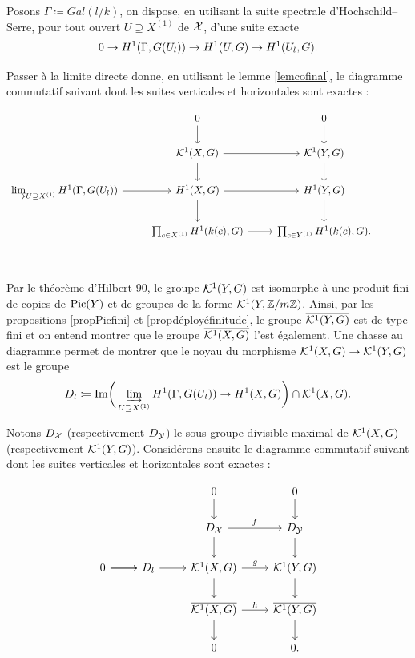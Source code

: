 \documentclass[11pt]{article}
\begin{document}
Posons $\Gamma \coloneqq Gal(l/k)$, on dispose, en utilisant la suite spectrale d'Hochschild–Serre, pour tout ouvert $U \supseteq X^{(1)}$ de $\mathcal{X}$, d'une suite exacte
$$
0 \rightarrow H^1(\Gamma, G(U_{l})) \rightarrow H^1(U, G) \rightarrow H^1(U_{l}, G).
$$

Passer à la limite directe donne, en utilisant le lemme \ref{lemcofinal}, le diagramme commutatif suivant dont les suites verticales et horizontales sont exactes :

\[\begin{tikzcd}
    & 0 & 0 \\
	& \CK^1(X, G) & \CK^1(Y, G) \\
	{ \drl_{U \supseteq X^{(1)}} H^1(\Gamma, G(U_l))} & {H^1(X, G)} & {H^1(Y, G)} & {} \\
	 & {\prod_{c \in X^{(1)}} H^1(k(c), G)} & {\prod_{c \in Y^{(1)}} H^1(k(c), G).}  \\
	\arrow[from=2-2, to=2-3]
    \arrow[from=3-1, to=3-2]
    \arrow[from=3-2, to=3-3]
    \arrow[from=4-2, to=4-3]
	\arrow[from=2-2, to=3-2]
	\arrow[from=2-3, to=3-3]
    \arrow[from=1-2, to=2-2]
	\arrow[from=1-3, to=2-3]
    \arrow[from=3-2, to=4-2]
    \arrow[from=3-3, to=4-3]
\end{tikzcd}\]

Par le théorème d'Hilbert 90, le groupe $\mathcal{K}^1(Y, G)$ est isomorphe à une produit fini de copies de $\operatorname{Pic}(Y)$ et de groupes de la forme $\mathcal{K}^1(Y, \mathbb{Z} /m\mathbb{Z})$. Ainsi, par les propositions \ref{propPicfini} et \ref{propdéployéfinitude}, le groupe $\overline{\mathcal{K}^1(Y,G)}$ est de type fini et on entend montrer que le groupe $\overline{\mathcal{K}^1(X,G)}$ l'est également.
 Une chasse au diagramme permet de montrer que le noyau du morphisme $\mathcal{K}^1(X,G) \rightarrow \mathcal{K}^1(Y,G)$ est le groupe 
 $$
 D_{l} \coloneqq \text{Im}\bigg(\drl_{U \supseteq X^{(1)}} H^1(\Gamma, G(U_l)) \ra H^1(X, G) \bigg) \cap \CK^1(X, G).$$
 
Notons $D_{\mathcal{X}}$ (respectivement $D_{\mathcal{Y}}$) le sous groupe divisible maximal de $\mathcal{K}^1(X,G)$ (respectivement $\mathcal{K}^1(Y,G)$).
Considérons  ensuite le diagramme commutatif suivant dont les suites verticales et horizontales sont exactes :

\[\begin{tikzcd}
   &  & 0 & 0 \\
  & &   D_{\CX} & D_{\CY} \\
	0 & D_{l} & \CK^1(X, G) & \CK^1(Y, G) \\
 & & {\ol{\CK^1(X, G)}} & {\ol{\CK^1(Y, G)}} \\
 &  & 0 & 0. \\
    \arrow[from=2-3, to=2-4, "f"]
    \arrow[from=3-1, to=3-2]
    \arrow[from=3-2, to=3-3]
    \arrow[from=3-3, to=3-4, "g"]
    \arrow[from=4-3, to=4-4, "h"]
	\arrow[from=2-3, to=3-3]
    \arrow[from=2-4, to=3-4]
    \arrow[from=3-1, to=3-2]
	\arrow[from=1-3, to=2-3]
    \arrow[from=1-4, to=2-4]
    \arrow[from=3-3, to=4-3]
    \arrow[from=3-4, to=4-4]
	\arrow[from=4-3, to=5-3]
    \arrow[from=4-4, to=5-4]
\end{tikzcd}\]
\end{document}
